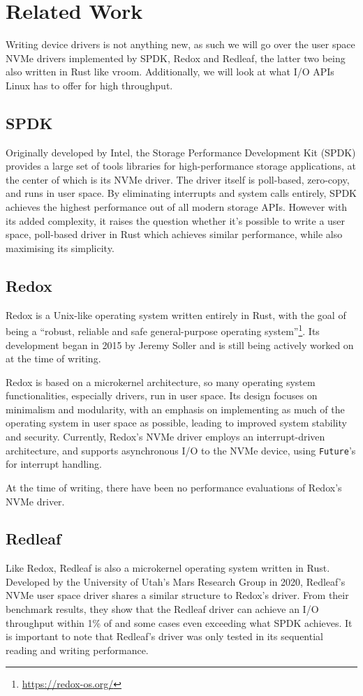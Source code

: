 \chapter{Related Work}\label{chapter:related}
Writing device drivers is not anything new, as such we will go over the user space NVMe drivers implemented by SPDK, Redox and Redleaf, the latter two being also written in Rust like vroom. Additionally, we will look at what I/O APIs Linux has to offer for high throughput.

\section{SPDK}
Originally developed by Intel, the Storage Performance Development Kit (SPDK) provides a large set of tools libraries for high-performance storage applications, at the center of which is its NVMe driver. The driver itself is poll-based, zero-copy, and runs in user space. By eliminating interrupts and system calls entirely, SPDK achieves the highest performance out of all modern storage APIs\cite{storage_api}. However with its added complexity, it raises the question whether it's possible to write a user space, poll-based driver in Rust which achieves similar performance, while also maximising its simplicity.

\section{Redox}
Redox is a Unix-like operating system written entirely in Rust, with the goal of being a ``robust, reliable and safe general-purpose operating system''\footnote{\url{https://redox-os.org/}}. Its development began in 2015 by Jeremy Soller and is still being actively worked on at the time of writing.

Redox is based on a microkernel architecture, so many operating system functionalities, especially drivers, run in user space. Its design focuses on minimalism and modularity, with an emphasis on implementing as much of the operating system in user space as possible, leading to improved system stability and security. Currently, Redox's NVMe driver employs an interrupt-driven architecture, and supports asynchronous I/O to the NVMe device, using \texttt{Future}'s for interrupt handling.

At the time of writing, there have been no performance evaluations of Redox's NVMe driver.

\section{Redleaf}
Like Redox, Redleaf is also a microkernel operating system written in Rust. Developed by the University of Utah's Mars Research Group in 2020, Redleaf's NVMe user space driver shares a similar structure to Redox's driver. From their benchmark results, they show that the Redleaf driver can achieve an I/O throughput within 1\% of and some cases even exceeding what SPDK achieves\cite{redleaf}. It is important to note that Redleaf's driver was only tested in its sequential reading and writing performance.

